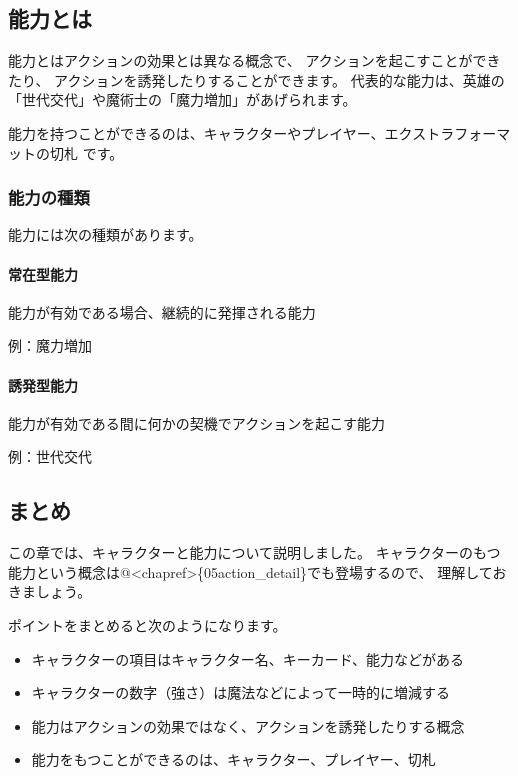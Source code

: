 \documentclass[letterpaper,10pt,dvipdfmx]{sphinxmanual}
\begin{document}
\subsection{能力とは}
\label{\detokenize{common/04-character:abi}}\label{\detokenize{common/04-character:id5}}
能力とはアクションの効果とは異なる概念で、
アクションを起こすことができたり、
アクションを誘発したりすることができます。
代表的な能力は、英雄の「世代交代」や魔術士の「魔力増加」があげられます。

能力を持つことができるのは、キャラクターやプレイヤー、エクストラフォーマットの切札
です。


\subsubsection{能力の種類}
\label{\detokenize{common/04-character:id6}}
能力には次の種類があります。


\paragraph{常在型能力}
\label{\detokenize{common/04-character:id7}}
能力が有効である場合、継続的に発揮される能力

例：魔力増加


\paragraph{誘発型能力}
\label{\detokenize{common/04-character:id8}}
能力が有効である間に何かの契機でアクションを起こす能力

例：世代交代


\subsection{まとめ}
\label{\detokenize{common/04-character:id9}}
この章では、キャラクターと能力について説明しました。
キャラクターのもつ能力という概念は@\textless{}chapref\textgreater{}\{05\sphinxhyphen{}action\_detail\}でも登場するので、
理解しておきましょう。

ポイントをまとめると次のようになります。
\begin{itemize}
\item {} 
キャラクターの項目はキャラクター名、キーカード、能力などがある

\item {} 
キャラクターの数字（強さ）は魔法などによって一時的に増減する

\item {} 
能力はアクションの効果ではなく、アクションを誘発したりする概念

\item {} 
能力をもつことができるのは、キャラクター、プレイヤー、切札

\end{itemize}
\end{document}
